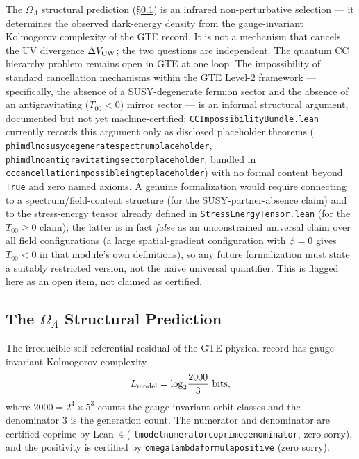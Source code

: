 \documentclass[11pt]{article}
\theoremstyle{remark}
\newcommand{\lean}[1]{%
  \penalty-100
  \begingroup\def\_{\textunderscore\allowbreak}\texttt{#1}\endgroup}
\begin{document}
The $\Omega_\Lambda$ structural prediction (\S\ref{sec:omega_lambda}) is an
infrared non-perturbative selection — it determines the observed dark-energy density
from the gauge-invariant Kolmogorov complexity of the GTE record.  It is not a
mechanism that cancels the UV divergence $\Delta V_{\rm CW}$; the two questions are
independent.  The quantum CC hierarchy problem remains open in GTE at one loop.
The impossibility of standard cancellation mechanisms within the GTE Level-2 framework --- specifically, the absence of a SUSY-degenerate fermion sector and the absence of an antigravitating ($T_{00}<0$) mirror sector --- is an informal structural argument, documented but not yet machine-certified: \texttt{CCImpossibilityBundle.lean} currently records this argument only as disclosed placeholder theorems (\lean{phimdl\_no\_susy\_degenerate\_spectrum\_placeholder}, \lean{phimdl\_no\_antigravitating\_sector\_placeholder}, bundled in \lean{cc\_cancellation\_impossible\_in\_gte\_placeholder}) with no formal content beyond \texttt{True} and zero named axioms. A genuine formalization would require connecting to a spectrum/field-content structure (for the SUSY-partner-absence claim) and to the stress-energy tensor already defined in \texttt{StressEnergyTensor.lean} (for the $T_{00}\geq 0$ claim); the latter is in fact \emph{false} as an unconstrained universal claim over all field configurations (a large spatial-gradient configuration with $\phi=0$ gives $T_{00}<0$ in that module's own definitions), so any future formalization must state a suitably restricted version, not the naive universal quantifier. This is flagged here as an open item, not claimed as certified.

\subsection{The $\Omega_\Lambda$ Structural Prediction}
\label{sec:omega_lambda}

The irreducible self-referential residual of the GTE physical record has gauge-invariant
Kolmogorov complexity
\begin{equation}
  L_{\rm model} = \log_2\!\frac{2000}{3}~\text{bits},
\end{equation}
where $2000 = 2^4\times 5^3$ counts the gauge-invariant orbit classes and the
denominator $3$ is the generation count.  The numerator and denominator are certified
coprime by Lean~4 (\lean{lmodel\_numerator\_coprime\_denominator}, zero sorry), and the
positivity is certified by \lean{omega\_lambda\_formula\_positive} (zero sorry).
\end{document}
